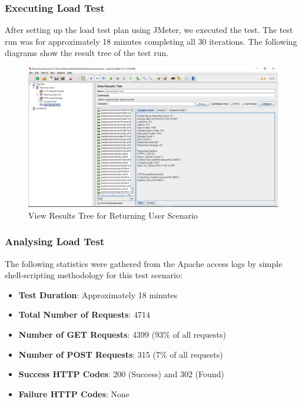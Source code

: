 \documentclass[fontsize=12pt,paper=letter,twoside]{scrartcl}
\begin{document}
\subsubsection{Executing Load Test}
After setting up the load test plan using JMeter, we executed the test. The test run was for approximately 18 minutes completing all 30 iterations. The following diagrams show the result tree of the test run.

\begin{figure}[!htb]
\begin{center}
\includegraphics[width=.9\textwidth]{../../load-test/test-plans/returning-user/result-tree.png}
\end{center}
\caption{View Results Tree for Returning User Scenario}
\label{fig:ruser:view_result_tree}
\end{figure}

\subsubsection{Analysing Load Test}
The following statistics were gathered from the Apache access logs by simple shell-scripting methodology for this test scenario:
\begin{itemize}
\item \textbf{Test Duration}: Approximately 18 minutes
\item \textbf{Total Number of Requests}: 4714
\item \textbf{Number of GET Requests}: 4399 (93\% of all requests)
\item \textbf{Number of POST Requests}: 315 (7\% of all requests)
\item \textbf{Success HTTP Codes}: 200 (Success) and 302 (Found)
\item \textbf{Failure HTTP Codes}: None
\end{itemize}
\end{document}
